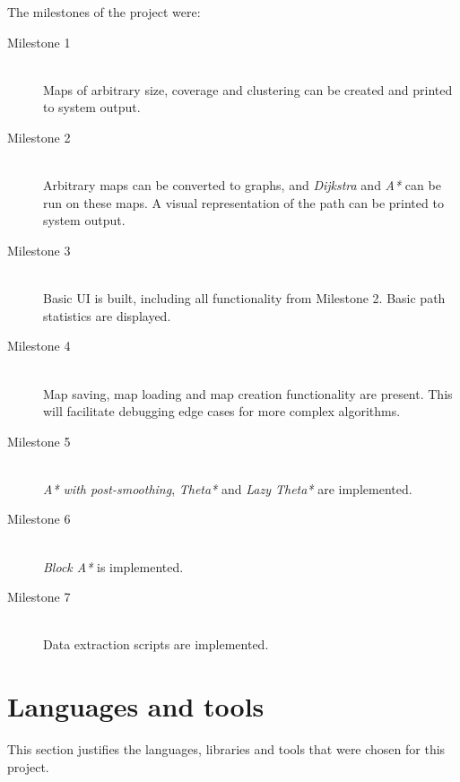 \documentclass[12pt,notitlepage]{report}
\begin{document}
\noindent The milestones of the project were:
\begin{description}
\item[Milestone 1]\hfil \\
Maps of arbitrary size, coverage and clustering can be created and printed to system output.
\item[Milestone 2]\hfil \\
Arbitrary maps can be converted to graphs, and {\em Dijkstra} and {\em A*} can be run on these maps. A visual representation of the path can be printed to system output.
\item[Milestone 3]\hfil \\
Basic UI is built, including all functionality from Milestone 2. Basic path statistics are displayed.
\item[Milestone 4]\hfil \\
Map saving, map loading and map creation functionality are present. This will facilitate debugging edge cases for more complex algorithms.
\item[Milestone 5]\hfil \\
{\em A* with post-smoothing}, {\em Theta*} and {\em Lazy Theta*} are implemented.
\item[Milestone 6]\hfil \\
{\em Block A*} is implemented.
\item[Milestone 7]\hfil \\
Data extraction scripts are implemented.
\end{description}

\section {Languages and tools}

This section justifies the languages, libraries and tools that were chosen for this project.
\end{document}
